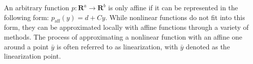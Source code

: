 An arbitrary function $p : \mathbf{R}^a \rightarrow \mathbf{R}^b$ is only affine if it can be represented in the following form: $p_\text{aff}(y) = d + Cy$.
While nonlinear functions do not fit into this form, they can be approximated locally with affine functions through a variety of methods.
The process of approximating a nonlinear function with an affine one around a point $\bar{y}$ is often referred to as linearization, with $\bar{y}$ denoted as the linearization point. 
%
